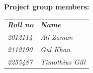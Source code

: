 \begin{titlepage}
    \vspace{1cm}

    {\Large\bfseries Project group members:\par}
    \begin{center}
    \begin{tabular}{l l}
        \textit{\textbf{Roll no}} & \textit{\textbf{Name}} \\
        \textit{2012114} & \textit{Ali Zaman} \\
        \textit{2112190} & \textit{Gul Khan} \\
        \textit{2255487} & \textit{Timothius Gill} \\
    \end{tabular}
    \end{center}

    \vfill
\end{titlepage}
